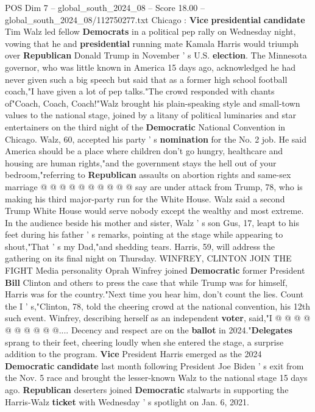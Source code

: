 \begin{textsample}{POS Dim 7 – global\_south\_2024\_08 – Score 18.00 – global\_south\_2024\_08/112750277.txt}  \label{ex:f7_pos_177}
Chicago : \textbf{Vice} \textbf{presidential} \textbf{candidate} Tim Walz led fellow \textbf{Democrats} in a political pep rally on Wednesday night, vowing that he and \textbf{presidential} running mate Kamala Harris would triumph over \textbf{Republican} Donald Trump in November ' s U.S. \textbf{election}.
The Minnesota governor, who was little known in America 15 days ago, acknowledged he had never given such a big speech but said that as a former high school football coach,"I have given a lot of pep talks."The crowd responded with chants of"Coach, Coach, Coach!"Walz brought his plain-speaking style and small-town values to the national stage, joined by a litany of political luminaries and star entertainers on the third night of the \textbf{Democratic} National Convention in Chicago.
Walz, 60, accepted his party ' s \textbf{nomination} for the No. 2 job.
He said America should be a place where children don't go hungry, healthcare and housing are human rights,"and the government stays the hell out of your bedroom,"referring to \textbf{Republican} assaults on abortion rights and same-sex marriage @ @ @ @ @ @ @ @ @ @ say are under attack from Trump, 78, who is making his third major-party run for the White House.
Walz said a second Trump White House would serve nobody except the wealthy and most extreme.
In the audience beside his mother and sister, Walz ' s son Gus, 17, leapt to his feet during his father ' s remarks, pointing at the stage while appearing to shout,"That ' s my Dad,"and shedding tears.
Harris, 59, will address the gathering on its final night on Thursday.
WINFREY, CLINTON JOIN THE FIGHT Media personality Oprah Winfrey joined \textbf{Democratic} former President \textbf{Bill} Clinton and others to press the case that while Trump was for himself, Harris was for the country."Next time you hear him, don't count the lies.
Count the I ' s,"Clinton, 78, told the cheering crowd at the national convention, his 12th such event.
Winfrey, describing herself as an independent \textbf{voter}, said,"I @ @ @ @ @ @ @ @ @ @....
Decency and respect are on the \textbf{ballot} in 2024."\textbf{Delegates} sprang to their feet, cheering loudly when she entered the stage, a surprise addition to the program. \textbf{Vice} President Harris emerged as the 2024 \textbf{Democratic} \textbf{candidate} last month following President Joe Biden ' s exit from the Nov. 5 race and brought the lesser-known Walz to the national stage 15 days ago. \textbf{Republican} deserters joined \textbf{Democratic} stalwarts in supporting the Harris-Walz \textbf{ticket} with Wednesday ' s spotlight on Jan. 6, 2021.

\end{textsample}
